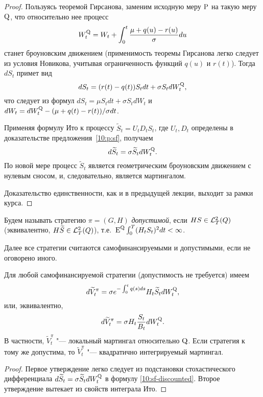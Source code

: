 \begin{proof}
Пользуясь теоремой Гирсанова, заменим исходную меру $\P$ на такую меру $\Q$, что относительно нее процесс 
\[
W_t^{\Q} = W_t + \int_0^t \frac{\mu+q(u)-r(u)}{\sigma} du
\]
станет броуновским движением (применимость теоремы Гирсанова легко следует из условия Новикова, учитывая ограниченность функций $q(u)$ и $r(t)$).
Тогда $d S_t$ примет вид
\begin{equation}
\label{10:dS}
d S_t = (r(t)-q(t))S_t dt + \sigma S_t d W_t^{\Q},
\end{equation}
что следует из формул $dS_t = \mu S_t dt + \sigma S_t dW_t$ и $d W_t = dW_t^{\Q} - (\mu+q(t)-r(t))/\sigma dt$.

Применяя формулу Ито к процессу $\tilde S_t = U_tD_t S_t$, где $U_t,D_t$ определены в доказательстве предложения~\ref{10:p:sf}, получаем 
\[
d \tilde S_t = \sigma \tilde S_t d W_t^{\Q}.
\]
По новой мере процесс $\tilde S_t$ является геометрическим броуновским движением с нулевым сносом, и, следовательно, является мартингалом.

Доказательство единственности, как и в предыдущей лекции, выходит за рамки курса.
\end{proof}

\begin{definition}
\label{10:d:admissible}
Будем называть стратегию $\pi=(G,H)$ \emph{допустимой}, если $HS \in \L_T^2(Q)$ (эквивалентно, $H\tilde S \in \L_T^2(Q)$), т.е.\ $\E^{\Q} \int_0^T (H_tS_t)^2 dt < \infty$.
\end{definition} 

Далее все стратегии считаются самофинансируемыми и допустимыми, если не оговорено иного.

\begin{proposition}
Для любой самофинансируемой стратегии (допустимость не требуется) имеем
\begin{equation}
\label{10:V-dynamics}
d \tilde V_t^\pi = \sigma e^{-\int_0^t q(s)ds} H_t \tilde S_t d W_t^{\Q},
\end{equation}
или, эквивалентно,
\[
d \tilde V_t^\pi = \sigma H_t \frac{S_t}{B_t} d W_t^{\Q}.
\]
В частности, $\tilde V_t^\pi$ "--- локальный мартингал относительно $\Q$. Если стратегия к тому же допустима, то $\tilde V_t^\pi$ "--- квадратично интегрируемый мартингал.
\end{proposition}

\begin{proof}
Первое утверждение легко следует из подстановки стохастического дифференциала $d \tilde S_t = \sigma \tilde S_t d W_t^{\Q}$ в формулу \eqref{10:sf-discounted}.
Второе утверждение вытекает из свойств интеграла Ито.
\end{proof}


